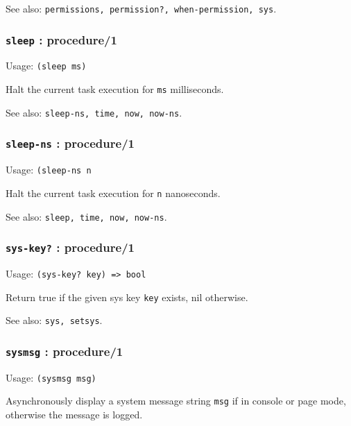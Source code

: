 \documentclass[
]{article}
\newcommand{\passthrough}[1]{#1}
\begin{document}
See also:
\passthrough{\lstinline!permissions, permission?, when-permission, sys!}.

\hypertarget{sleep-procedure1}{%
\subsubsection{\texorpdfstring{\texttt{sleep} :
procedure/1}{sleep : procedure/1}}\label{sleep-procedure1}}

Usage: \passthrough{\lstinline!(sleep ms)!}

Halt the current task execution for \passthrough{\lstinline!ms!}
milliseconds.

See also: \passthrough{\lstinline!sleep-ns, time, now, now-ns!}.

\hypertarget{sleep-ns-procedure1}{%
\subsubsection{\texorpdfstring{\texttt{sleep-ns} :
procedure/1}{sleep-ns : procedure/1}}\label{sleep-ns-procedure1}}

Usage: \passthrough{\lstinline!(sleep-ns n!}

Halt the current task execution for \passthrough{\lstinline!n!}
nanoseconds.

See also: \passthrough{\lstinline!sleep, time, now, now-ns!}.

\hypertarget{sys-key-procedure1}{%
\subsubsection{\texorpdfstring{\texttt{sys-key?} :
procedure/1}{sys-key? : procedure/1}}\label{sys-key-procedure1}}

Usage: \passthrough{\lstinline!(sys-key? key) => bool!}

Return true if the given sys key \passthrough{\lstinline!key!} exists,
nil otherwise.

See also: \passthrough{\lstinline!sys, setsys!}.

\hypertarget{sysmsg-procedure1}{%
\subsubsection{\texorpdfstring{\texttt{sysmsg} :
procedure/1}{sysmsg : procedure/1}}\label{sysmsg-procedure1}}

Usage: \passthrough{\lstinline!(sysmsg msg)!}

Asynchronously display a system message string
\passthrough{\lstinline!msg!} if in console or page mode, otherwise the
message is logged.
\end{document}
